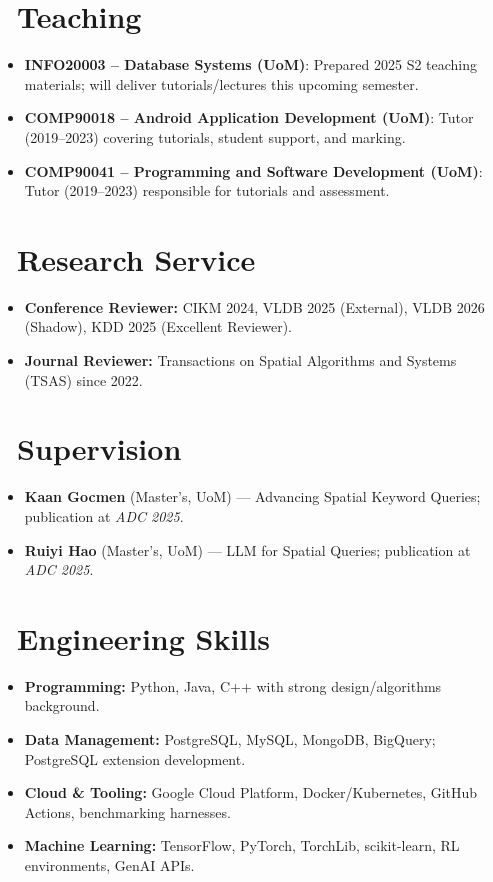 \documentclass{resume}
\begin{document}
\section{\faGraduationCap\ \textbf{Teaching}}
\begin{itemize}[parsep=0.35ex]
  \item \textbf{INFO20003 – Database Systems (UoM)}: Prepared 2025 S2 teaching materials; will deliver tutorials/lectures this upcoming semester.
  \item \textbf{COMP90018 – Android Application Development (UoM)}: Tutor (2019–2023) covering tutorials, student support, and marking.
  \item \textbf{COMP90041 – Programming and Software Development (UoM)}: Tutor (2019–2023) responsible for tutorials and assessment.
\end{itemize}

\section{\faUsers\ \textbf{Research Service}}
\begin{itemize}[parsep=0.35ex]
  \item \textbf{Conference Reviewer:} CIKM 2024, VLDB 2025 (External), VLDB 2026 (Shadow), KDD 2025 (Excellent Reviewer).
  \item \textbf{Journal Reviewer:} Transactions on Spatial Algorithms and Systems (TSAS) since 2022.
\end{itemize}

\section{\faBriefcase\ \textbf{Supervision}}
\begin{itemize}[parsep=0.35ex]
  \item \textbf{Kaan Gocmen} (Master’s, UoM) — Advancing Spatial Keyword Queries; publication at \textit{ADC 2025}.
  \item \textbf{Ruiyi Hao} (Master’s, UoM) — LLM for Spatial Queries; publication at \textit{ADC 2025}.
\end{itemize}

\section{\faCogs\ \textbf{Engineering Skills}}
\begin{itemize}[parsep=0.35ex]
  \item \textbf{Programming:} Python, Java, C++ with strong design/algorithms background.
  \item \textbf{Data Management:} PostgreSQL, MySQL, MongoDB, BigQuery; PostgreSQL extension development.
  \item \textbf{Cloud \& Tooling:} Google Cloud Platform, Docker/Kubernetes, GitHub Actions, benchmarking harnesses.
  \item \textbf{Machine Learning:} TensorFlow, PyTorch, TorchLib, scikit-learn, RL environments, GenAI APIs.
\end{itemize}
\end{document}
